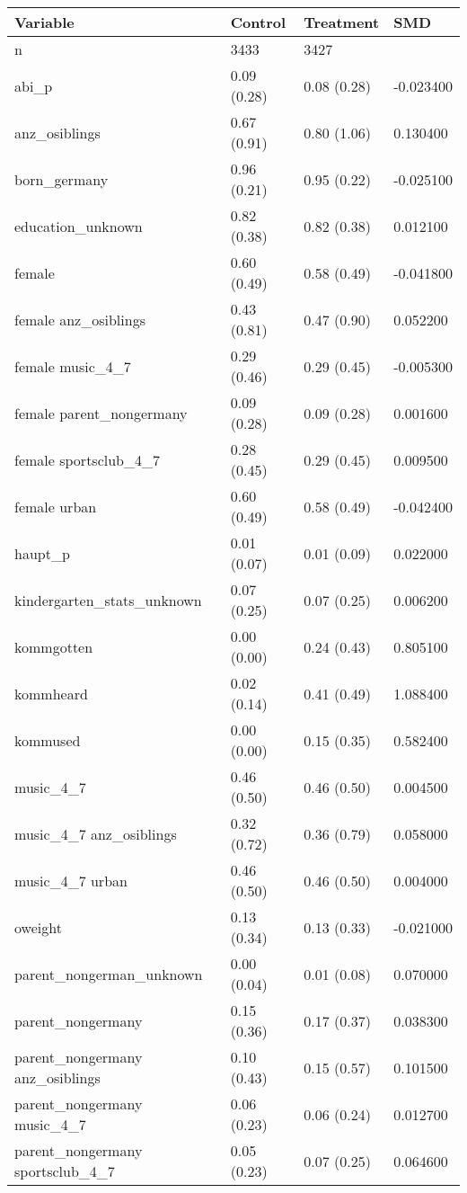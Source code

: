 \begin{tabular}{llll}
\toprule
Variable & Control & Treatment & SMD \\
\midrule
n & 3433 & 3427 &  \\
abi\_p & 0.09 (0.28) & 0.08 (0.28) & -0.023400 \\
anz\_osiblings & 0.67 (0.91) & 0.80 (1.06) & 0.130400 \\
born\_germany & 0.96 (0.21) & 0.95 (0.22) & -0.025100 \\
education\_unknown & 0.82 (0.38) & 0.82 (0.38) & 0.012100 \\
female & 0.60 (0.49) & 0.58 (0.49) & -0.041800 \\
female anz\_osiblings & 0.43 (0.81) & 0.47 (0.90) & 0.052200 \\
female music\_4\_7 & 0.29 (0.46) & 0.29 (0.45) & -0.005300 \\
female parent\_nongermany & 0.09 (0.28) & 0.09 (0.28) & 0.001600 \\
female sportsclub\_4\_7 & 0.28 (0.45) & 0.29 (0.45) & 0.009500 \\
female urban & 0.60 (0.49) & 0.58 (0.49) & -0.042400 \\
haupt\_p & 0.01 (0.07) & 0.01 (0.09) & 0.022000 \\
kindergarten\_stats\_unknown & 0.07 (0.25) & 0.07 (0.25) & 0.006200 \\
kommgotten & 0.00 (0.00) & 0.24 (0.43) & 0.805100 \\
kommheard & 0.02 (0.14) & 0.41 (0.49) & 1.088400 \\
kommused & 0.00 (0.00) & 0.15 (0.35) & 0.582400 \\
music\_4\_7 & 0.46 (0.50) & 0.46 (0.50) & 0.004500 \\
music\_4\_7 anz\_osiblings & 0.32 (0.72) & 0.36 (0.79) & 0.058000 \\
music\_4\_7 urban & 0.46 (0.50) & 0.46 (0.50) & 0.004000 \\
oweight & 0.13 (0.34) & 0.13 (0.33) & -0.021000 \\
parent\_nongerman\_unknown & 0.00 (0.04) & 0.01 (0.08) & 0.070000 \\
parent\_nongermany & 0.15 (0.36) & 0.17 (0.37) & 0.038300 \\
parent\_nongermany anz\_osiblings & 0.10 (0.43) & 0.15 (0.57) & 0.101500 \\
parent\_nongermany music\_4\_7 & 0.06 (0.23) & 0.06 (0.24) & 0.012700 \\
parent\_nongermany sportsclub\_4\_7 & 0.05 (0.23) & 0.07 (0.25) & 0.064600 \\

\end{tabular}
